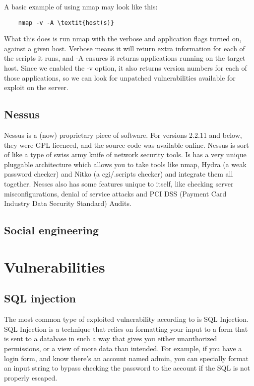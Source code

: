 \documentclass{report}
\begin{document}
A basic example of using nmap may look like this:

\begin{verbatim}
    nmap -v -A \textit{host(s)}
\end{verbatim}

What this does is run nmap with the verbose and application flags turned on,
against a given host. Verbose means it will return extra information for each 
of the scripts it runs, and -A ensures it returns applications running on the
target host. Since we enabled the -v option, it also returns version numbers
for each of those applications, so we can look for unpatched vulnerabilities
available for exploit on the server.

\subsection*{Nessus}

Nessus is a (now) proprietary piece of software. For versions 2.2.11 and below,
they were GPL licenced, and the source code was available online. Nessus is
sort of like a type of swiss army knife of network security tools. Is has
a very unique pluggable architecture which allows you to take tools like
nmap, Hydra (a weak password checker) and Nitko (a cgi/.scripts checker) and
integrate them all together. Nesses also has some features unique to itself,
like checking server misconfigurations, denial of service attacks and
PCI DSS (Payment Card Industry Data Security Standard) Audits.

\subsection*{Social engineering}

\section*{Vulnerabilities}

\subsection*{SQL injection}

The most common type of exploited vulnerability according to
\cite{mostcommonvulnerability} is SQL Injection. SQL Injection is a technique
that relies on formatting your input to a form that is sent to a database in
such a way that gives you either unauthorized permissions, or a view of more
data than intended. For example, if you have a login form, and know there's
an account named admin, you can specially format an input string to bypass
checking the password to the account if the SQL is not properly escaped.
\end{document}
